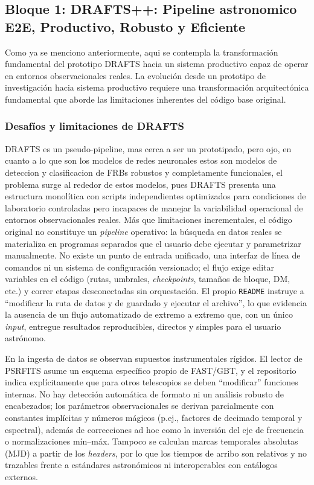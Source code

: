 \subsection{Bloque 1: DRAFTS++: Pipeline astronomico E2E, Productivo, Robusto y Eficiente}

Como ya se menciono anteriormente, aqui se contempla la transformación fundamental del prototipo DRAFTS hacia un sistema productivo capaz de operar en entornos observacionales reales. La evolución desde un prototipo de investigación hacia sistema productivo requiere una transformación arquitectónica fundamental que aborde las limitaciones inherentes del código base original.

\subsubsection{Desafíos y limitaciones de DRAFTS}

DRAFTS es un pseudo-pipeline, mas cerca a ser un prototipado, pero ojo, en cuanto a lo que son los modelos de redes neuronales estos son modelos de deteccion y clasificacion de FRBs robustos y completamente funcionales, el problema surge al rededor de estos modelos, pues DRAFTS presenta una estructura monolítica con scripts independientes optimizados para condiciones de laboratorio controladas pero incapaces de manejar la variabilidad operacional de entornos observacionales reales. Más que limitaciones incrementales, el código original no constituye un \emph{pipeline} operativo: la búsqueda en datos reales se materializa en programas separados que el usuario debe ejecutar y parametrizar manualmente. No existe un punto de entrada unificado, una interfaz de línea de comandos ni un sistema de configuración versionado; el flujo exige editar variables en el código (rutas, umbrales, \textit{checkpoints}, tamaños de bloque, DM, etc.) y correr etapas desconectadas sin orquestación. El propio \texttt{README} instruye a “modificar la ruta de datos y de guardado y ejecutar el archivo”, lo que evidencia la ausencia de un flujo automatizado de extremo a extremo que, con un único \emph{input}, entregue resultados reproducibles, directos y simples para el usuario astrónomo.

En la ingesta de datos se observan supuestos instrumentales rígidos. El lector de PSRFITS asume un esquema específico propio de FAST/GBT, y el repositorio indica explícitamente que para otros telescopios se deben “modificar” funciones internas. No hay detección automática de formato ni un análisis robusto de encabezados; los parámetros observacionales se derivan parcialmente con constantes implícitas y números mágicos (p.ej., factores de decimado temporal y espectral), además de correcciones ad hoc como la inversión del eje de frecuencia o normalizaciones mín--máx. Tampoco se calculan marcas temporales absolutas (MJD) a partir de los \emph{headers}, por lo que los tiempos de arribo son relativos y no trazables frente a estándares astronómicos ni interoperables con catálogos externos.

